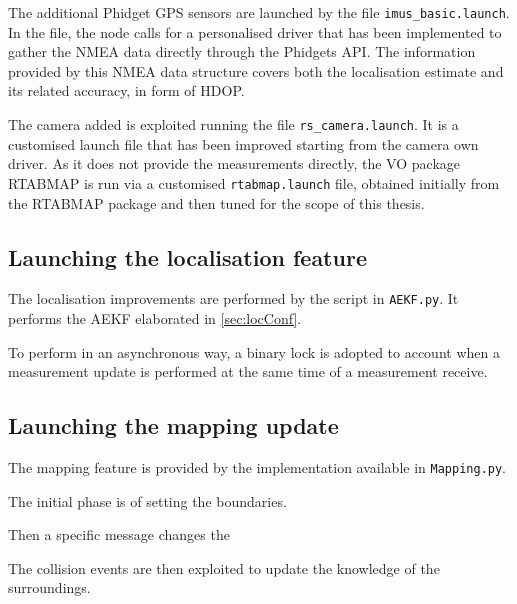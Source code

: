The additional Phidget \gls{GPS} sensors are launched by the file \texttt{imus\_basic.launch}.
In the file, the node calls for a personalised driver that has been implemented to gather the \gls{NMEA} data directly through the Phidgets \gls{API}.
The information provided by this \gls{NMEA} data structure covers both the localisation estimate and its related accuracy, in form of \gls{HDOP}.

The camera added is exploited running the file \texttt{rs\_camera.launch}.
It is a customised launch file that has been improved starting from the camera own driver.
As it does not provide the measurements directly, the \gls{VO} package \gls{RTABMAP} is run via a customised \texttt{rtabmap.launch} file, obtained initially from the \gls{RTABMAP} package and then tuned for the scope of this thesis.



\subsection{Launching the localisation feature}
\noindent The localisation improvements are performed by the script in \texttt{AEKF.py}.
It performs the \gls{AEKF} elaborated in \ref{sec:locConf}.

To perform in an asynchronous way, a binary lock is adopted to account when a measurement update is performed at the same time of a measurement receive.


\subsection{Launching the mapping update}
\noindent The mapping feature is provided by the implementation available in \texttt{Mapping.py}.

The initial phase is of setting the boundaries.

Then a specific message changes the

The collision events are then exploited to update the knowledge of the surroundings.




